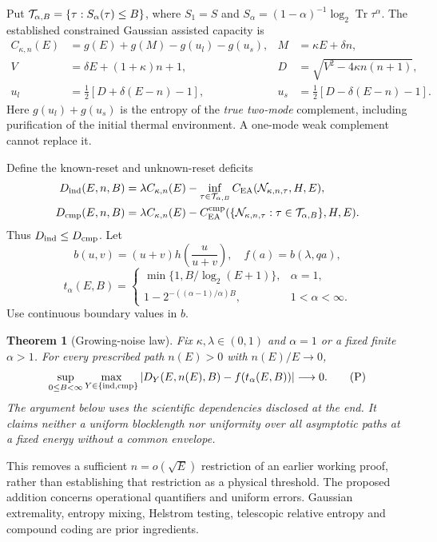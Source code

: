 \documentclass[11pt]{article}
\newtheorem{theorem}{Theorem}
\newcommand{\Tr}{\operatorname{Tr}}
\newcommand{\CEA}{C_{\mathrm{EA}}}
\newcommand{\cmp}{\mathrm{cmp}}
\begin{document}
Put \({\cal T}_{\alpha,B}=\{\tau:S_\alpha(\tau)\le B\}\), where
\(S_1=S\) and \(S_\alpha=(1-\alpha)^{-1}\log_2\Tr\tau^\alpha\).
The established constrained Gaussian assisted capacity
\cite{hw,hs} is
\begin{align}
 C_{\kappa,n}(E)&=g(E)+g(M)-g(u_l)-g(u_s),&
 M&=\kappa E+\delta n,\tag{C}\label{eq:C}\\
 V&=\delta E+(1+\kappa)n+1,&
 D&=\sqrt{V^2-4\kappa n(n+1)},\nonumber\\
 u_l&=\tfrac12[D+\delta(E-n)-1],&
 u_s&=\tfrac12[D-\delta(E-n)-1].\nonumber
\end{align}
Here \(g(u_l)+g(u_s)\) is the entropy of the \emph{true two-mode}
complement, including purification of the initial thermal environment.
A one-mode weak complement cannot replace it.

Define the known-reset and unknown-reset deficits
\[
\begin{split}
 D_{\rm ind}(E,n,B)&=\lambda C_{\kappa,n}(E)-
       \inf_{\tau\in{\cal T}_{\alpha,B}}\CEA({\cal N}_{\kappa,n,\tau},H,E),\\
 D_{\cmp}(E,n,B)&=\lambda C_{\kappa,n}(E)-
       \CEA^{\cmp}(\{{\cal N}_{\kappa,n,\tau}:\tau\in{\cal T}_{\alpha,B}\},H,E).
\end{split}
\]
Thus \(D_{\rm ind}\le D_{\cmp}\). Let
\[
 b(u,v)=(u+v)h\!\left(\frac{u}{u+v}\right),\quad f(a)=b(\lambda,qa),
\]
\[
 t_\alpha(E,B)=
 \begin{cases}
 \min\{1,B/\log_2(E+1)\},&\alpha=1,\\
 1-2^{-((\alpha-1)/\alpha)B},&1<\alpha<\infty .
 \end{cases}
\]
Use continuous boundary values in \(b\).
\begin{theorem}[Growing-noise law]\label{thm:main}
Fix \(\kappa,\lambda\in(0,1)\) and \(\alpha=1\) or a fixed finite
\(\alpha>1\). For every prescribed path \(n(E)>0\) with \(n(E)/E\to0\),
\[
 \sup_{0\le B<\infty}\max_{Y\in\{{\rm ind},\cmp\}}
 \left|D_Y(E,n(E),B)-f(t_\alpha(E,B))\right|\longrightarrow0.
 \tag{P}
\]
The argument below uses the scientific dependencies disclosed at the end.
It claims neither a uniform blocklength nor uniformity over
all asymptotic paths at a fixed energy without a common envelope.
\end{theorem}
This removes a sufficient \(n=o(\sqrt E)\) restriction of an earlier
working proof, rather than establishing that restriction as a physical
threshold. The proposed addition concerns operational quantifiers and
uniform errors. Gaussian extremality, entropy mixing, Helstrom testing,
telescopic relative entropy and compound coding are prior ingredients.
\end{document}
